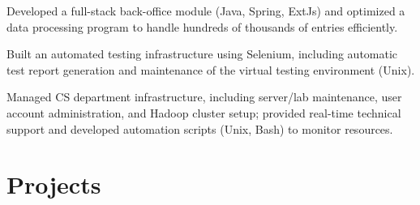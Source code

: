 \documentclass[]{main}
\begin{document}
\begin{minipage}[t]{0.73\textwidth}
\begin{tightemize}
\item Developed a full-stack back-office module (Java, Spring, ExtJs) and optimized a data processing program to handle hundreds of thousands of entries efficiently.
\item Built an automated testing infrastructure using Selenium, including automatic test report generation and maintenance of the virtual testing environment (Unix).
\end{tightemize}
\sectionsep

\begin{tightemize}
\item Managed CS department infrastructure, including server/lab maintenance, user account administration, and Hadoop cluster setup; provided real-time technical support and developed automation scripts (Unix, Bash) to monitor resources.
\end{tightemize}
\sectionsep

\section{Projects}
\sectionsep


\end{minipage}
\end{document}
